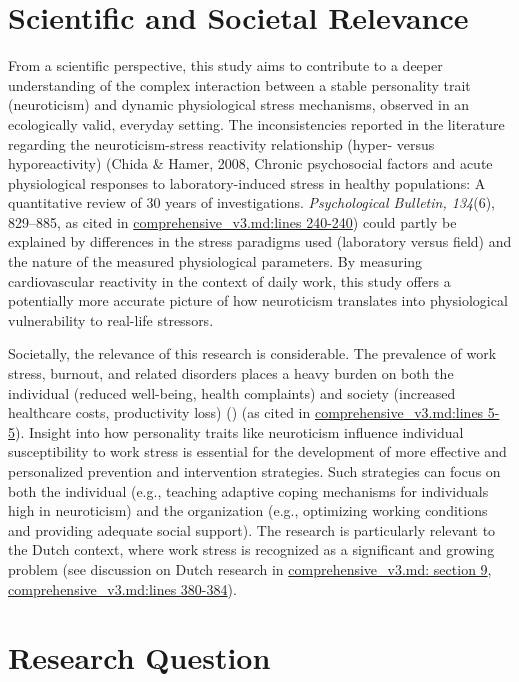 \documentclass[11pt, a4paper]{report}
\newcommand{\pdfcite}[2]{\cite{#1} (\href{run:./papers/#2.pdf}{\texttt{\detokenize{#2.pdf}}})}
\newcommand{\mdcite}[3]{\href{run:./sources/#1}{\url{#1}:lines #2-#3}} %
\newcommand{\mdcitesec}[2]{\href{run:./sources/#1}{\url{#1}: section #2}}
\begin{document}
\section{Scientific and Societal Relevance}
\label{sec:relevance}

From a scientific perspective, this study aims to contribute to a deeper understanding of the complex interaction between a stable personality trait (neuroticism) and dynamic physiological stress mechanisms, observed in an ecologically valid, everyday setting. The inconsistencies reported in the literature regarding the neuroticism-stress reactivity relationship (hyper- versus hyporeactivity) (Chida \& Hamer, 2008, Chronic psychosocial factors and acute physiological responses to laboratory-induced stress in healthy populations: A quantitative review of 30 years of investigations. \textit{Psychological Bulletin, 134}(6), 829–885, as cited in \mdcite{comprehensive_v3.md}{240}{240}) could partly be explained by differences in the stress paradigms used (laboratory versus field) and the nature of the measured physiological parameters. By measuring cardiovascular reactivity in the context of daily work, this study offers a potentially more accurate picture of how neuroticism translates into physiological vulnerability to real-life stressors.

Societally, the relevance of this research is considerable. The prevalence of work stress, burnout, and related disorders places a heavy burden on both the individual (reduced well-being, health complaints) and society (increased healthcare costs, productivity loss) \pdfcite{Schaufeli_ManagingStressNL}{Managing Job Stress in the Netherlands} (as cited in \mdcite{comprehensive_v3.md}{5}{5}). Insight into how personality traits like neuroticism influence individual susceptibility to work stress is essential for the development of more effective and personalized prevention and intervention strategies. Such strategies can focus on both the individual (e.g., teaching adaptive coping mechanisms for individuals high in neuroticism) and the organization (e.g., optimizing working conditions and providing adequate social support). The research is particularly relevant to the Dutch context, where work stress is recognized as a significant and growing problem (see discussion on Dutch research in \mdcitesec{comprehensive_v3.md}{9}, \mdcite{comprehensive_v3.md}{380}{384}).

\section{Research Question}
\label{sec:research_question} %
\end{document}
